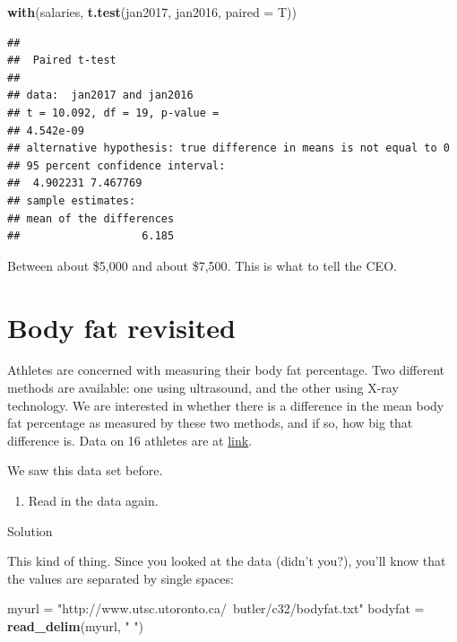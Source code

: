 \documentclass[]{tufte-book}
\newenvironment{Shaded}{}{}
\newcommand{\DataTypeTok}[1]{\textcolor[rgb]{0.56,0.13,0.00}{#1}}
\newcommand{\KeywordTok}[1]{\textcolor[rgb]{0.00,0.44,0.13}{\textbf{#1}}}
\newcommand{\NormalTok}[1]{#1}
\newcommand{\StringTok}[1]{\textcolor[rgb]{0.25,0.44,0.63}{#1}}
\providecommand{\tightlist}{%
  \setlength{\itemsep}{0pt}\setlength{\parskip}{0pt}}
\theoremstyle{definition}
\theoremstyle{definition}
\theoremstyle{definition}
\theoremstyle{remark}
\begin{document}
\begin{Shaded}
\begin{Highlighting}[]
\KeywordTok{with}\NormalTok{(salaries, }\KeywordTok{t.test}\NormalTok{(jan2017, jan2016, }\DataTypeTok{paired =}\NormalTok{ T))}
\end{Highlighting}
\end{Shaded}

\begin{verbatim}
## 
##  Paired t-test
## 
## data:  jan2017 and jan2016
## t = 10.092, df = 19, p-value =
## 4.542e-09
## alternative hypothesis: true difference in means is not equal to 0
## 95 percent confidence interval:
##  4.902231 7.467769
## sample estimates:
## mean of the differences 
##                   6.185
\end{verbatim}

Between about \$5,000 and about \$7,500. This is what to tell the CEO.

\hypertarget{body-fat-revisited}{%
\section{Body fat revisited}\label{body-fat-revisited}}

Athletes are concerned with measuring their body fat percentage. Two
different methods are available: one using ultrasound, and the other
using X-ray technology. We are interested in whether there is a
difference in the mean body fat percentage as measured by these two
methods, and if so, how big that difference is. Data on 16 athletes are
at \href{http://www.utsc.utoronto.ca/~butler/c32/bodyfat.txt}{link}.

We saw this data set before.

\begin{enumerate}
\def\labelenumi{(\alph{enumi})}
\tightlist
\item
  Read in the data again.
\end{enumerate}

Solution

This kind of thing. Since you looked at the data (didn't you?), you'll
know that the values are separated by single spaces:

\begin{Shaded}
\begin{Highlighting}[]
\NormalTok{myurl =}\StringTok{ "http://www.utsc.utoronto.ca/~butler/c32/bodyfat.txt"}
\NormalTok{bodyfat =}\StringTok{ }\KeywordTok{read_delim}\NormalTok{(myurl, }\StringTok{" "}\NormalTok{)}
\end{Highlighting}
\end{Shaded}
\end{document}
